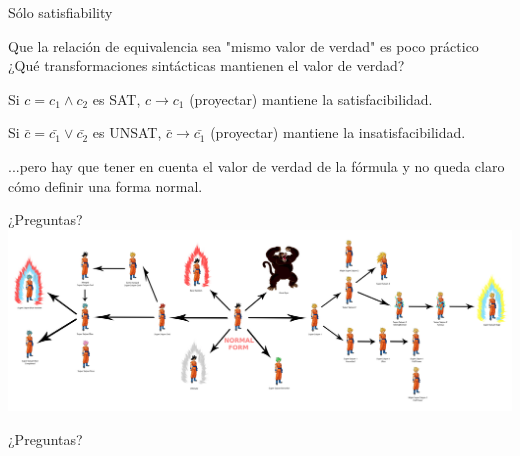 \documentclass[10pt]{beamer}
\begin{document}
\begin{frame}{Sólo satisfiability}

Que la relación de equivalencia sea "mismo valor de verdad" es poco práctico \\
¿Qué transformaciones sintácticas mantienen el valor de verdad? \pause

Si $c = c_1 \land c_2$ es SAT, $c \rightarrow c_1$ (proyectar) mantiene la satisfacibilidad.

Si $\bar{c} = \bar{c_1} \lor \bar{c_2}$ es UNSAT, $\bar{c} \rightarrow \bar{c_1}$ (proyectar) mantiene la insatisfacibilidad.

...pero hay que tener en cuenta el valor de verdad de la fórmula y no queda claro cómo definir una forma normal. \pause


\end{frame}

\begin{frame}{¿Preguntas?}
	\hspace*{-1.75cm}\includegraphics[scale=0.034]{dbz.jpg}
	
	\Huge{¿Preguntas?}
\end{frame}
\end{document}
